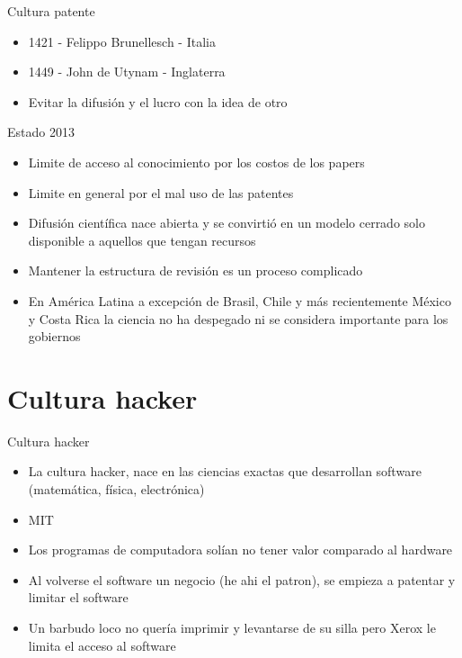 \documentclass{beamer}
\begin{document}
\begin{frame}{Cultura patente}
\begin{itemize}
\item 1421 - Felippo Brunellesch - Italia
\item 1449 - John de Utynam - Inglaterra
\item Evitar la difusión y el lucro con la idea de otro
\end{itemize}
\end{frame}

\begin{frame}{Estado 2013}
\begin{itemize}
\item Limite de acceso al conocimiento por los costos de los papers
\item Limite en general por el mal uso de las patentes
\item Difusión científica nace abierta y se convirtió en un modelo cerrado solo disponible a aquellos que tengan recursos
\item Mantener la estructura de revisión es un proceso complicado
\item En América Latina a excepción de Brasil, Chile y más recientemente México y Costa Rica la ciencia no ha despegado ni se considera importante para los gobiernos\cite{Latorre1990}
\end{itemize}



\end{frame}

\section{Cultura hacker}
\begin{frame}{Cultura hacker}
\begin{itemize}
\item La cultura hacker, nace en las ciencias exactas que desarrollan software (matemática, física, electrónica)
\item MIT
\item Los programas de computadora solían no tener valor comparado al hardware
\item Al volverse el software un negocio (he ahi el patron), se empieza a patentar y limitar el software
\item Un barbudo loco no quería imprimir y levantarse de su silla pero Xerox le limita el acceso al software
\end{itemize}
\end{frame}
\end{document}

